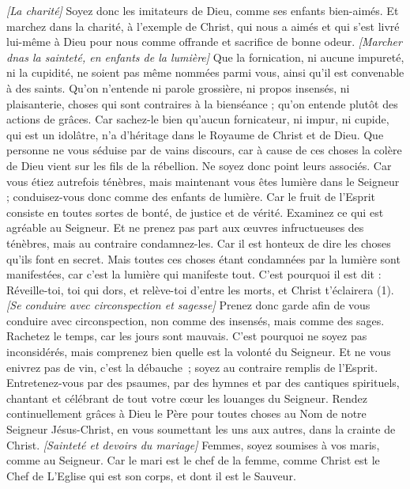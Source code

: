 \begin{multicols}{2}
\textit{[La charité]}
\VerseOne{}Soyez donc les imitateurs de Dieu, comme ses enfants bien-aimés.
Et marchez dans la charité, à l’exemple de Christ, qui nous a aimés et qui s'est livré lui-même à Dieu pour nous comme offrande et sacrifice de bonne odeur.
\textit{[Marcher dnas la sainteté, en enfants de la lumière]}
Que la fornication, ni aucune impureté, ni la cupidité, ne soient pas même nommées parmi vous, ainsi qu’il est convenable à des saints.
Qu’on n’entende ni parole grossière, ni propos insensés, ni plaisanterie, choses qui sont contraires à la bienséance ; qu’on entende plutôt des actions de grâces.
Car sachez-le bien qu’aucun fornicateur, ni impur, ni cupide, qui est un idolâtre, n'a d'héritage dans le Royaume de Christ et de Dieu.
Que personne ne vous séduise par de vains discours, car à cause de ces choses la colère de Dieu vient sur les fils de la rébellion.
Ne soyez donc point leurs associés.
Car vous étiez autrefois ténèbres, mais maintenant vous êtes lumière dans le Seigneur ; conduisez-vous donc comme des enfants de lumière.
Car le fruit de l'Esprit consiste en toutes sortes de bonté, de justice et de vérité.
Examinez ce qui est agréable au Seigneur.
Et ne prenez pas part aux œuvres infructueuses des ténèbres, mais au contraire condamnez-les.
Car il est honteux de dire les choses qu'ils font en secret.
Mais toutes ces choses étant condamnées par la lumière sont manifestées, car c’est la lumière qui manifeste tout.
C'est pourquoi il est dit : Réveille-toi, toi qui dors, et relève-toi d'entre les morts, et Christ t'éclairera (1).
\textit{[Se conduire avec circonspection et sagesse]}
Prenez donc garde afin de vous conduire avec circonspection, non comme des insensés, mais comme des sages.
Rachetez le temps, car les jours sont mauvais.
C'est pourquoi ne soyez pas inconsidérés, mais comprenez bien quelle est la volonté du Seigneur.
Et ne vous enivrez pas de vin, c’est la débauche ; soyez au contraire remplis de l'Esprit.
Entretenez-vous par des psaumes, par des hymnes et par des cantiques spirituels, chantant et célébrant de tout votre cœur les louanges du Seigneur.
Rendez continuellement grâces à Dieu le Père pour toutes choses au Nom de notre Seigneur Jésus-Christ,
en vous soumettant les uns aux autres, dans la crainte de Christ.
\textit{[Sainteté et devoirs du mariage]}
Femmes, soyez soumises à vos maris, comme au Seigneur.
Car le mari est le chef de la femme, comme Christ est le Chef de L’Eglise qui est son corps, et dont il est le Sauveur.

\end{multicols}
